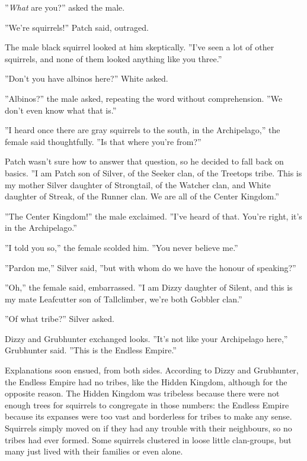 \documentclass[12pt]{book}
\begin{document}
 ''{\it What} are you?'' asked the male.\par
 ''We're squirrels!'' Patch said, outraged.\par
 The male black squirrel looked at him skeptically. ''I've seen a lot of other squirrels, and none of them looked anything like you three.''\par
 ''Don't you have albinos here?'' White asked.\par
 ''Albinos?'' the male asked, repeating the word without comprehension. ''We don't even know what that is.''\par
 ''I heard once there are gray squirrels to the south, in the Archipelago,'' the female said thoughtfully. ''Is that where you're from?''\par
 Patch wasn't sure how to answer that question, so he decided to fall back on basics. ''I am Patch son of Silver, of the Seeker clan, of the Treetops tribe. This is my mother Silver daughter of Strongtail, of the Watcher clan, and White daughter of Streak, of the Runner clan. We are all of the Center Kingdom.''\par
 ''The Center Kingdom!'' the male exclaimed. ''I've heard of that. You're right, it's in the Archipelago.''\par
 ''I told you so,'' the female scolded him. ''You never believe me.''\par
 ''Pardon me,'' Silver said, ''but with whom do we have the honour of speaking?''\par
 ''Oh,'' the female said, embarrassed. ''I am Dizzy daughter of Silent, and this is my mate Leafcutter son of Tallclimber, we're both Gobbler clan.''\par
 ''Of what tribe?'' Silver asked.\par
 Dizzy and Grubhunter exchanged looks. ''It's not like your Archipelago here,'' Grubhunter said. ''This is the Endless Empire.''\par
 Explanations soon ensued, from both sides. According to Dizzy and Grubhunter, the Endless Empire had no tribes, like the Hidden Kingdom, although for the opposite reason. The Hidden Kingdom was tribeless because there were not enough trees for squirrels to congregate in those numbers: the Endless Empire because its expanses were too vast and borderless for tribes to make any sense. Squirrels simply moved on if they had any trouble with their neighbours, so no tribes had ever formed. Some squirrels clustered in loose little clan-groups, but many just lived with their families or even alone.\par
\end{document}
